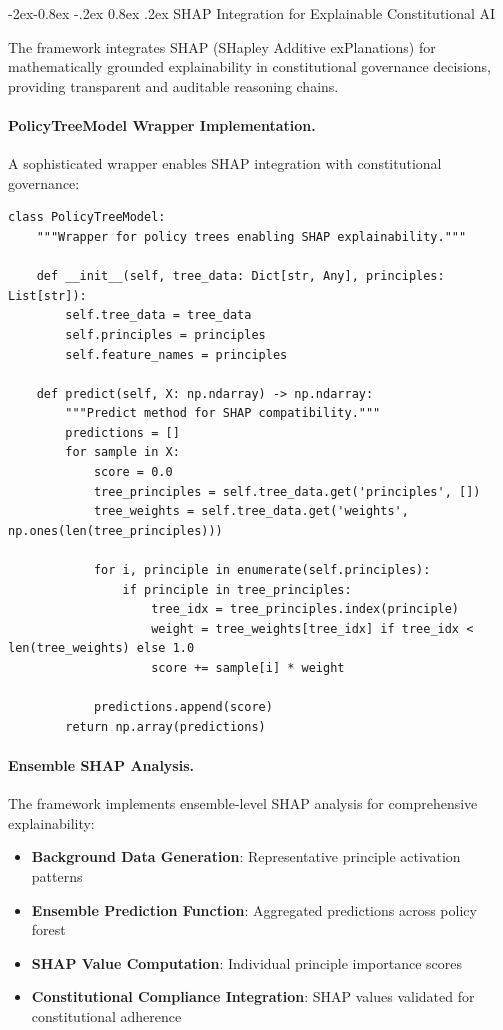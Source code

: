 \documentclass[manuscript,screen,9pt]{acmart}
\makeatletter
\renewcommand\subsubsection{\@startsection{subsubsection}{3}{\z@}%
  {-2ex\@plus -0.8ex \@minus -.2ex}%
  {0.8ex \@plus .2ex}%
  {\normalfont\normalsize\bfseries}}
\makeatother
\begin{document}
\subsubsection{SHAP Integration for Explainable Constitutional AI}
\label{subsubsec:shap_integration}

The framework integrates SHAP (SHapley Additive exPlanations) for mathematically grounded explainability in constitutional governance decisions, providing transparent and auditable reasoning chains.

\paragraph{PolicyTreeModel Wrapper Implementation.}
A sophisticated wrapper enables SHAP integration with constitutional governance:

\begin{lstlisting}[caption=PolicyTreeModel SHAP Integration, label=lst:shap_integration]
class PolicyTreeModel:
    """Wrapper for policy trees enabling SHAP explainability."""

    def __init__(self, tree_data: Dict[str, Any], principles: List[str]):
        self.tree_data = tree_data
        self.principles = principles
        self.feature_names = principles

    def predict(self, X: np.ndarray) -> np.ndarray:
        """Predict method for SHAP compatibility."""
        predictions = []
        for sample in X:
            score = 0.0
            tree_principles = self.tree_data.get('principles', [])
            tree_weights = self.tree_data.get('weights', np.ones(len(tree_principles)))

            for i, principle in enumerate(self.principles):
                if principle in tree_principles:
                    tree_idx = tree_principles.index(principle)
                    weight = tree_weights[tree_idx] if tree_idx < len(tree_weights) else 1.0
                    score += sample[i] * weight

            predictions.append(score)
        return np.array(predictions)
\end{lstlisting}

\paragraph{Ensemble SHAP Analysis.}
The framework implements ensemble-level SHAP analysis for comprehensive explainability:

\begin{itemize}[itemsep=1pt,parsep=1pt]
    \item \textbf{Background Data Generation}: Representative principle activation patterns
    \item \textbf{Ensemble Prediction Function}: Aggregated predictions across policy forest
    \item \textbf{SHAP Value Computation}: Individual principle importance scores
    \item \textbf{Constitutional Compliance Integration}: SHAP values validated for constitutional adherence
\end{itemize}
\end{document}
